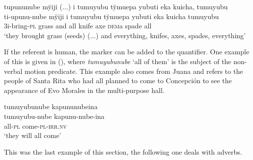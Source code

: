 \ea\label{ex:tumuyubu-2}
\begingl
\glpreamble tupununube mÿiji (...) i tumuyubu tÿmuepa yubuti eka kuicha, tumuyubu\\
\gla ti-upunu-nube mÿiji i tumuyubu tÿmuepa yubuti eka kuicha tumuyubu\\
\glb 3i-bring-\textsc{pl} grass and all knife axe \textsc{dem}a spade all\\
\glft ‘they brought grass (seeds) (...) and everything, knifes, axes, spades, everything’
\endgl
\trailingcitation{[jxx-p120515l-2.036-039]}
\xe

If the referent is human, the  marker can be added to the quantifier. One example of this is given in (), where \textit{tumuyubunube} ‘all of them’ is the subject of the non-verbal motion predicate. This example also comes from Juana and refers to the people of Santa Rita who had all planned to come to Concepción to see the appearance of Evo Morales in the multi-purpose hall.

\ea\label{ex:tumuyubu-1}
\begingl
\glpreamble tumuyubunube kapununubeina\\
\gla tumuyubu-nube kapunu-nube-ina\\
\glb all-\textsc{pl} come-\textsc{pl}-\textsc{irr.nv}\\
\glft ‘they will all come’
\endgl
\trailingcitation{[jxx-p150920l.079]}
\xe



This was the last example of this section, the following one deals with adverbs.




















